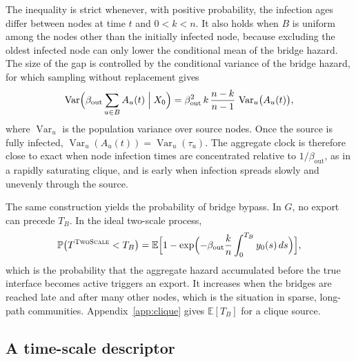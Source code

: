 \documentclass[a4paper,fleqn]{cas-sc}
\newcommand{\TS}{\textup{\textsc{TwoScale}}}
\begin{document}
The inequality is strict whenever, with positive probability, the infection ages differ between nodes at time $t$ and $0<k<n$. It also holds when $B$ is uniform among the nodes other than the initially infected node, because excluding the oldest infected node can only lower the conditional mean of the bridge hazard. The size of the gap is controlled by the conditional variance of the bridge hazard, for which sampling without replacement gives
\begin{equation}
\label{eq:hazard_variance}
\operatorname{Var}\Bigl(\beta_{\mathrm{out}}\sum_{u\in B}A_u(t)\Bigm| X_0\Bigr)=\beta_{\mathrm{out}}^2\,k\,\frac{n-k}{n-1}\,\operatorname{Var}_u\bigl(A_u(t)\bigr),
\end{equation}
where $\operatorname{Var}_u$ is the population variance over source nodes. Once the source is fully infected, $\operatorname{Var}_u(A_u(t))=\operatorname{Var}_u(\tau_u)$. The aggregate clock is therefore close to exact when node infection times are concentrated relative to $1/\beta_{\mathrm{out}}$, as in a rapidly saturating clique, and is early when infection spreads slowly and unevenly through the source.

The same construction yields the probability of bridge bypass. In $G$, no export can precede $T_B$. In the ideal two-scale process,
\begin{equation}
\label{eq:bypass}
\mathbb{P}\bigl(T^{\TS}<T_B\bigr)=\mathbb{E}\Bigl[1-\exp\Bigl(-\beta_{\mathrm{out}}\frac{k}{n}\int_0^{T_B}y_0(s)\,ds\Bigr)\Bigr],
\end{equation}
which is the probability that the aggregate hazard accumulated before the true interface becomes active triggers an export. It increases when the bridges are reached late and after many other nodes, which is the situation in sparse, long-path communities. Appendix~\ref{app:clique} gives $\mathbb{E}[T_B]$ for a clique source.

\subsection{A time-scale descriptor}
\label{sec:descriptor}
\end{document}
